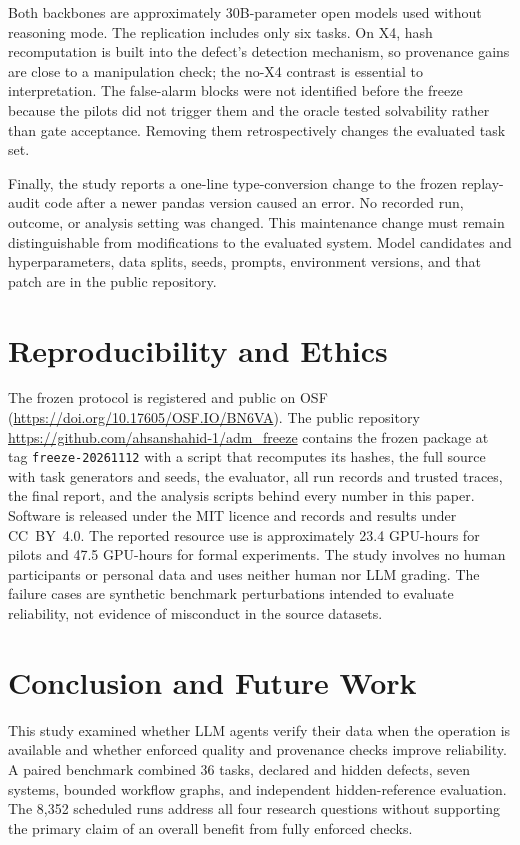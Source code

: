 \documentclass[conference]{IEEEtran}
\newcommand{\code}[1]{\texttt{#1}}
\begin{document}
Both backbones are approximately 30B-parameter open models used without reasoning mode. The replication includes only six tasks. On X4, hash recomputation is built into the defect's detection mechanism, so provenance gains are close to a manipulation check; the no-X4 contrast is essential to interpretation. The false-alarm blocks were not identified before the freeze because the pilots did not trigger them and the oracle tested solvability rather than gate acceptance. Removing them retrospectively changes the evaluated task set.

Finally, the study reports a one-line type-conversion change to the frozen replay-audit code after a newer pandas version caused an error. No recorded run, outcome, or analysis setting was changed. This maintenance change must remain distinguishable from modifications to the evaluated system. Model candidates and hyperparameters, data splits, seeds, prompts, environment versions, and that patch are in the public repository.

\section{Reproducibility and Ethics}
The frozen protocol is registered and public on OSF (\url{https://doi.org/10.17605/OSF.IO/BN6VA}). The public repository \url{https://github.com/ahsanshahid-1/adm_freeze} contains the frozen package at tag \code{freeze-20261112} with a script that recomputes its hashes, the full source with task generators and seeds, the evaluator, all run records and trusted traces, the final report, and the analysis scripts behind every number in this paper. Software is released under the MIT licence and records and results under CC~BY~4.0. The reported resource use is approximately 23.4 GPU-hours for pilots and 47.5 GPU-hours for formal experiments. The study involves no human participants or personal data and uses neither human nor LLM grading. The failure cases are synthetic benchmark perturbations intended to evaluate reliability, not evidence of misconduct in the source datasets.

\section{Conclusion and Future Work}
This study examined whether LLM agents verify their data when the operation is available and whether enforced quality and provenance checks improve reliability. A paired benchmark combined 36 tasks, declared and hidden defects, seven systems, bounded workflow graphs, and independent hidden-reference evaluation. The 8,352 scheduled runs address all four research questions without supporting the primary claim of an overall benefit from fully enforced checks.
\end{document}
